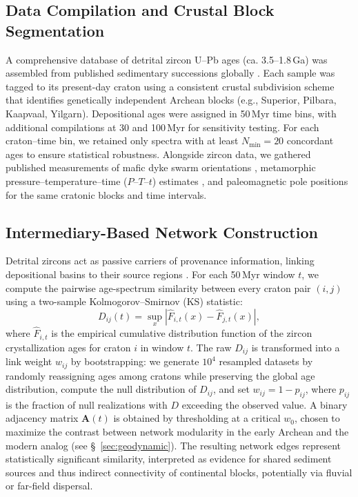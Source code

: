 \documentclass{article}
\begin{document}
\subsection{Data Compilation and Crustal Block Segmentation}
A comprehensive database of detrital zircon U–Pb ages (ca. 3.5–1.8\,Ga) was assembled from published sedimentary successions globally \cite{voosen2024zircon, holder2022cratons}. Each sample was tagged to its present-day craton using a consistent crustal subdivision scheme that identifies genetically independent Archean blocks (e.g., Superior, Pilbara, Kaapvaal, Yilgarn). Depositional ages were assigned in 50\,Myr time bins, with additional compilations at 30 and 100\,Myr for sensitivity testing. For each craton–time bin, we retained only spectra with at least $N_{\min}=20$ concordant ages to ensure statistical robustness. Alongside zircon data, we gathered published measurements of mafic dyke swarm orientations \cite{swanson2024dyke}, metamorphic pressure–temperature–time ($P$–$T$–$t$) estimates \cite{brown2020metamorphic, holder2019blueschist}, and paleomagnetic pole positions \cite{evans2012reconstruction} for the same cratonic blocks and time intervals.

\subsection{Intermediary-Based Network Construction}
Detrital zircons act as passive carriers of provenance information, linking depositional basins to their source regions \cite{cawood2012detrital}. For each 50\,Myr window $t$, we compute the pairwise age-spectrum similarity between every craton pair $(i,j)$ using a two-sample Kolmogorov–Smirnov (KS) statistic:
\begin{equation}
D_{ij}(t) = \sup_x \left| \hat{F}_{i,t}(x) - \hat{F}_{j,t}(x) \right|,
\label{eq:ks}
\end{equation}
where $\hat{F}_{i,t}$ is the empirical cumulative distribution function of the zircon crystallization ages for craton $i$ in window $t$. The raw $D_{ij}$ is transformed into a link weight $w_{ij}$ by bootstrapping: we generate $10^4$ resampled datasets by randomly reassigning ages among cratons while preserving the global age distribution, compute the null distribution of $D_{ij}$, and set $w_{ij} = 1 - p_{ij}$, where $p_{ij}$ is the fraction of null realizations with $D$ exceeding the observed value. A binary adjacency matrix $\mathbf{A}(t)$ is obtained by thresholding at a critical $w_0$, chosen to maximize the contrast between network modularity in the early Archean and the modern analog (see \S~\ref{sec:geodynamic}). The resulting network edges represent statistically significant similarity, interpreted as evidence for shared sediment sources and thus indirect connectivity of continental blocks, potentially via fluvial or far-field dispersal.
\end{document}
